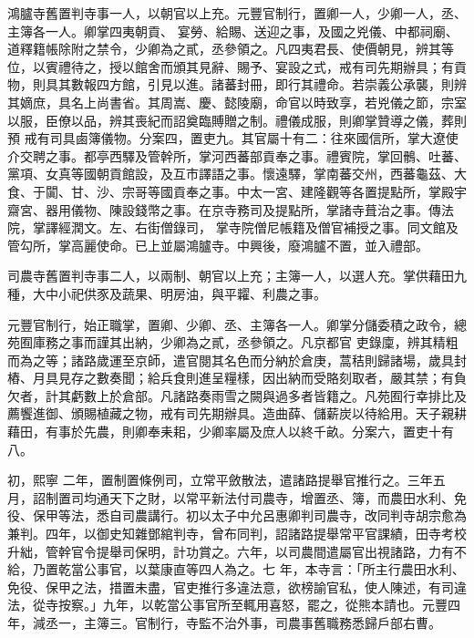 \begin{pinyinscope}
 鴻臚寺舊置判寺事一人，以朝官以上充。元豐官制行，置卿一人，少卿一人，丞、主簿各一人。卿掌四夷朝貢、
 宴勞、給賜、送迎之事，及國之兇儀、中都祠廟、道釋籍帳除附之禁令，少卿為之貳，丞參領之。凡四夷君長、使價朝見，辨其等位，以賓禮待之，授以館舍而頒其見辭、賜予、宴設之式，戒有司先期辦具；有貢物，則具其數報四方館，引見以進。諸蕃封冊，即行其禮命。若崇義公承襲，則辨其嫡庶，具名上尚書省。其周嵩、慶、懿陵廟，命官以時致享，若兇儀之節，宗室以服，臣僚以品，辨其喪紀而詔奠臨賻贈之制。禮儀成服，則卿掌贊導之儀，葬則預
 戒有司具鹵簿儀物。分案四，置吏九。其官屬十有二：往來國信所，掌大遼使介交聘之事。都亭西驛及管幹所，掌河西蕃部貢奉之事。禮賓院，掌回鶻、吐蕃、黨項、女真等國朝貢館設，及互市譯語之事。懷遠驛，掌南蕃交州，西蕃龜茲、大食、于闐、甘、沙、宗哥等國貢奉之事。中太一宮、建隆觀等各置提點所，掌殿宇齋宮、器用儀物、陳設錢幣之事。在京寺務司及提點所，掌諸寺葺治之事。傳法院，掌譯經潤文。左、右街僧錄司，
 掌寺院僧尼帳籍及僧官補授之事。同文館及管勾所，掌高麗使命。已上並屬鴻臚寺。中興後，廢鴻臚不置，並入禮部。



 司農寺舊置判寺事二人，以兩制、朝官以上充；主簿一人，以選人充。掌供藉田九種，大中小祀供豕及蔬果、明房油，與平糶、利農之事。



 元豐官制行，始正職掌，置卿、少卿、丞、主簿各一人。卿掌分儲委積之政令，總苑囿庫務之事而謹其出納，少卿為之貳，丞參領之。凡京都官
 吏錄廩，辨其精粗而為之等；諸路歲運至京師，遣官閱其名色而分納於倉庚，蒿秸則歸諸場，歲具封樁、月具見存之數奏聞；給兵食則進呈糧樣，因出納而受賂刻取者，嚴其禁；有負欠者，計其虧數上於倉部。凡諸路奏雨雪之闕與過多者皆籍之。凡苑囿行幸排比及薦饗進御、頒賜植藏之物，戒有司先期辦具。造曲薛、儲薪炭以待給用。天子親耕藉田，有事於先農，則卿奉耒耜，少卿率屬及庶人以終千畝。分案六，置吏十有八。



 初，熙寧
 二年，置制置條例司，立常平斂散法，遣諸路提舉官推行之。三年五月，詔制置司均通天下之財，以常平新法付司農寺，增置丞、簿，而農田水利、免役、保甲等法，悉自司農講行。初以太子中允呂惠卿判司農寺，改同判寺胡宗愈為兼判。四年，以御史知雜鄧綰判寺，曾布同判，詔諸路提舉常平官課績，田寺考校升絀，管幹官令提舉司保明，計功賞之。六年，以司農間遣屬官出視諸路，力有不給，乃置乾當公事官，以葉康直等四人為之。七
 年，本寺言：「所主行農田水利、免役、保甲之法，措置未盡，官吏推行多違法意，欲榜諭官私，使人陳述，有司違法，從寺按察。」九年，以乾當公事官所至輒用喜怒，罷之，從熊本請也。元豐四年，減丞一，主簿三。官制行，寺監不治外事，司農事舊職務悉歸戶部右曹。




\end{pinyinscope}
